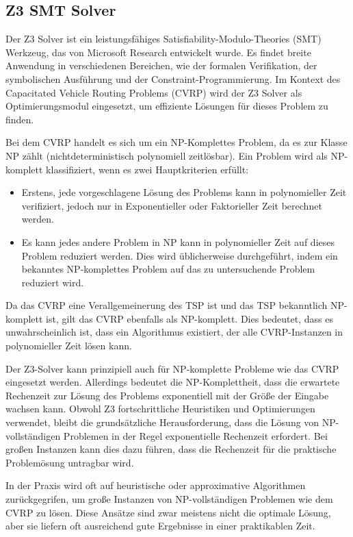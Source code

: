 \documentclass{IEEEtran}
\begin{document}
\subsection{Z3 SMT Solver}

Der Z3 Solver ist ein leistungsfähiges Satisfiability-Modulo-Theories (SMT) Werkzeug, 
das von Microsoft Research entwickelt wurde. Es findet breite Anwendung in verschiedenen 
Bereichen, wie der formalen Verifikation, der symbolischen Ausführung und der 
Constraint-Programmierung. Im Kontext des Capacitated Vehicle Routing Problems (CVRP) wird
der Z3 Solver als Optimierungsmodul eingesetzt, um effiziente Lösungen für dieses Problem
zu finden.

Bei dem CVRP handelt es sich um ein NP-Komplettes Problem, da es zur Klasse NP zählt (nichtdeterministisch polynomiell zeitlösbar). Ein Problem wird als NP-komplett klassifiziert, wenn es zwei Hauptkriterien erfüllt: 

\begin{itemize}
    \item Erstens, jede vorgeschlagene Lösung des Problems kann in polynomieller Zeit verifiziert, jedoch nur in Exponentieller oder Faktorieller Zeit berechnet werden.
    \item Es kann jedes andere Problem in NP kann in polynomieller Zeit auf dieses Problem reduziert werden. Dies wird üblicherweise durchgeführt, indem ein bekanntes NP-komplettes Problem auf das zu untersuchende Problem reduziert wird.
\end{itemize}

Da das CVRP eine Verallgemeinerung des TSP ist und das TSP bekanntlich NP-komplett ist, gilt das CVRP ebenfalls als NP-komplett. Dies bedeutet, dass es unwahrscheinlich ist, dass ein Algorithmus existiert, der alle CVRP-Instanzen in polynomieller Zeit lösen kann. 

Der Z3-Solver kann prinzipiell auch für NP-komplette Probleme wie das CVRP  eingesetzt werden. Allerdings bedeutet die NP-Komplettheit, dass die erwartete Rechenzeit zur Lösung des Problems exponentiell mit der Größe der Eingabe wachsen kann. Obwohl Z3 fortschrittliche Heuristiken und Optimierungen verwendet, bleibt die grundsätzliche Herausforderung, dass die Lösung von NP-vollständigen Problemen in der Regel exponentielle Rechenzeit erfordert. Bei großen Instanzen kann dies dazu führen, dass die Rechenzeit für die praktische Problemösung untragbar wird.

In der Praxis wird oft auf heuristische oder approximative Algorithmen zurückgegrifen, um große Instanzen von NP-vollständigen Problemen wie dem CVRP zu lösen. Diese Ansätze sind zwar meistens nicht die optimale Lösung, aber sie liefern oft ausreichend gute Ergebnisse in einer praktikablen Zeit.
\end{document}
